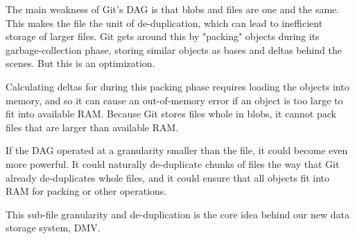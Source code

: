The main weakness of Git's \gls{DAG} is that \glspl{blob} and files are one and
the same. This makes the file the unit of de-duplication, which can lead to
inefficient storage of larger files. Git gets around this by "packing" objects
during its garbage-collection phase, storing similar objects as bases and deltas
behind the scenes. But this is an optimization.

Calculating deltas for during this packing phase requires loading the objects
into memory, and so it can cause an out-of-memory error if an object is too
large to fit into available RAM. Because Git stores files whole in \glspl{blob}, it
cannot pack files that are larger than available RAM.

If the \gls{DAG} operated at a granularity smaller than the file, it could
become even more powerful. It could naturally de-duplicate chunks of files the
way that Git already de-duplicates whole files, and it could ensure that all
objects fit into RAM for packing or other operations.

This sub-file granularity and de-duplication is the core idea behind our new
data storage system, \acrlong{DMV}.
